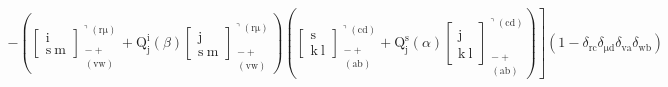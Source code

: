 \documentclass[12pt]{article}
\begin{document}
\begin{itemize}
\begin{equation}
\begin{aligned}
\left. - \left( \left[ \begin{smallmatrix} \mathrm{i} \\ \mathrm{s\ m} \end{smallmatrix} \right]^{\urcorner(\mathrm{r\mu})}_{\substack{- + \\ (\mathrm{vw})}} + \mathrm{Q}^\mathrm{i}_\mathrm{j}(\beta) \left[ \begin{smallmatrix} \mathrm{j} \\ \mathrm{s\ m} \end{smallmatrix} \right]^{\urcorner(\mathrm{r\mu})}_{\substack{- + \\ (\mathrm{vw})}} \right) \left( \left[ \begin{smallmatrix} \mathrm{s} \\ \mathrm{k\ l} \end{smallmatrix} \right]^{\urcorner(\mathrm{cd})}_{\substack{- + \\ (\mathrm{ab})}} + \mathrm{Q}^\mathrm{s}_\mathrm{j}(\alpha) \left[ \begin{smallmatrix} \mathrm{j} \\ \mathrm{k\ l} \end{smallmatrix} \right]^{\urcorner(\mathrm{cd})}_{\substack{- + \\ (\mathrm{ab})}} \right) \right] (1 - \delta_{\mathrm{rc}}\delta_{\mathrm{\mu d}}\delta_{\mathrm{va}}\delta_{\mathrm{wb}})
    \end{aligned} \tag{99b}
    \end{equation}


\end{itemize}
\end{document}
